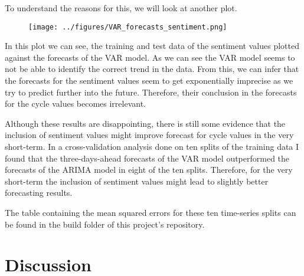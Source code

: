 \documentclass[11pt, a4paper, leqno]{article}
\begin{document}
To understand the reasons for this, we will look at another plot.

\begin{figure}[ht!]
    \texttt{[image: ../figures/VAR\_forecasts\_sentiment.png]}
\end{figure}

In this plot we can see, the training and test data of the sentiment values plotted against the forecasts of the VAR model. As we can see the VAR model seems to not be able to identify the correct trend in the data. From this, we can infer that the forecasts for the sentiment values seem to get exponentially imprecise as we try to predict further into the future. Therefore, their conclusion in the forecasts for the cycle values becomes irrelevant.

Although these results are disappointing, there is still some evidence that the inclusion of sentiment values might improve forecast for cycle values in the very short-term. In a cross-validation analysis done on ten splits of the training data I found that the three-days-ahead forecasts of the VAR model outperformed the forecasts of the ARIMA model in eight of the ten splits. Therefore, for the very short-term the inclusion of sentiment values might lead to slightly better forecasting results.

The table containing the mean squared errors for these ten time-series splits can be found in the build folder of this project's repository.

\section{Discussion}
\end{document}
